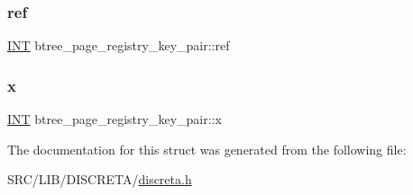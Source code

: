 \subsubsection{\texorpdfstring{ref}{ref}}
{\footnotesize\ttfamily \mbox{\hyperlink{galois_8h_a09fddde158a3a20bd2dcadb609de11dc}{I\+NT}} btree\+\_\+page\+\_\+registry\+\_\+key\+\_\+pair\+::ref}

\mbox{\label{structbtree__page__registry__key__pair_aacfd18886d4f7f327fdc5f197cb48ca4}} 
\subsubsection{\texorpdfstring{x}{x}}
{\footnotesize\ttfamily \mbox{\hyperlink{galois_8h_a09fddde158a3a20bd2dcadb609de11dc}{I\+NT}} btree\+\_\+page\+\_\+registry\+\_\+key\+\_\+pair\+::x}



The documentation for this struct was generated from the following file\+:\begin{DoxyCompactItemize}
\item 
S\+R\+C/\+L\+I\+B/\+D\+I\+S\+C\+R\+E\+T\+A/\mbox{\hyperlink{discreta_8h}{discreta.\+h}}\end{DoxyCompactItemize}
